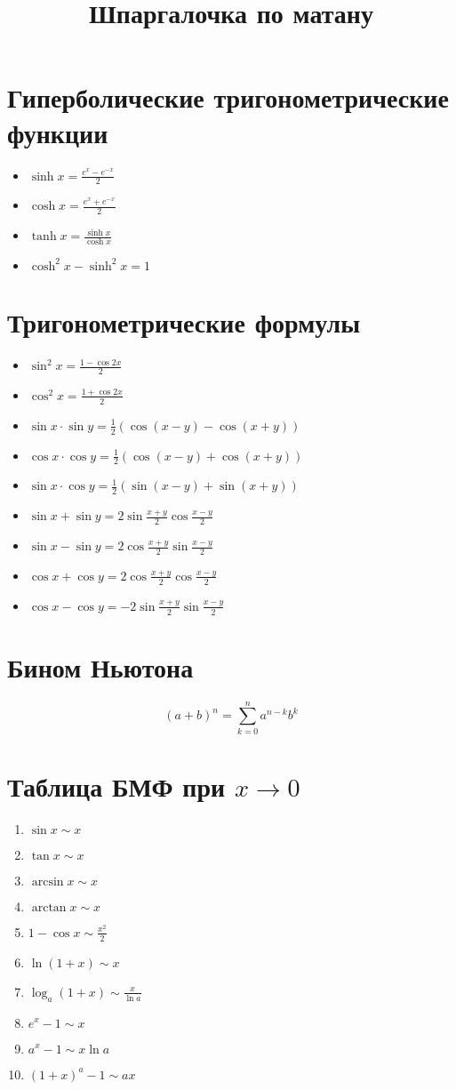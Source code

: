 \documentclass{article}
\begin{document}
   \title{Шпаргал\textbf{очка} по матану}
    \maketitle
    \section{Гиперболические тригонометрические функции}
    \begin{itemize}
	\item $\sinh x = \frac{e^x-e^{-x}}{2}$
	\item $\cosh x = \frac{e^x+e^{-x}}{2}$
	\item $\tanh x = \frac{\sinh x}{\cosh x}$
	\item $\cosh^2 x - \sinh^2 x = 1$
    \end{itemize}
	\section{Тригонометрические формулы}
	\begin{itemize}
		\item $\sin^2{x} = \frac{1-\cos{2x}}{2}$
		\item $\cos^2{x} = \frac{1+\cos{2x}}{2}$
		\item $\sin{x} \cdot \sin{y} = \frac{1}{2}(\cos(x-y) - \cos(x+y))$
		\item $\cos{x} \cdot \cos{y} = \frac{1}{2}(\cos(x-y) + \cos(x+y))$
		\item $\sin{x} \cdot \cos{y} = \frac{1}{2}(\sin(x-y) + \sin(x+y))$
		\item $\sin{x} + \sin{y} = 2\sin{\frac{x+y}{2}}\cos{\frac{x-y}{2}}$
		\item $\sin{x} - \sin{y} = 2\cos{\frac{x+y}{2}}\sin{\frac{x-y}{2}}$
		\item $\cos{x} + \cos{y} = 2\cos{\frac{x+y}{2}}\cos{\frac{x-y}{2}}$
		\item $\cos{x} - \cos{y} = -2\sin{\frac{x+y}{2}}\sin{\frac{x-y}{2}}$
	\end{itemize}
	
	\section{Бином Ньютона}
	$$ (a+b)^n = \sum_{k=0}^{n} a^{n-k}b^{k} $$
    \section{Таблица БМФ при $x \to 0 $}
    \begin{enumerate}
	\item $\sin x \sim x$
	\item $\tan{x} \sim x$
	\item $\arcsin x \sim x$
	\item $\arctan x \sim x$
	\item $1 - \cos{x} \sim \frac{x^2}{ 2}$
	\item $\ln{(1+x)} \sim x$
	\item $\log_a{(1+x)} \sim \frac{x}{\ln{a}}$
	\item $e^x -1 \sim x$
	\item $a^x-1 \sim x \ln{a}$
	\item $(1+x)^a-1 \sim ax$
    \end{enumerate}
\end{document}

